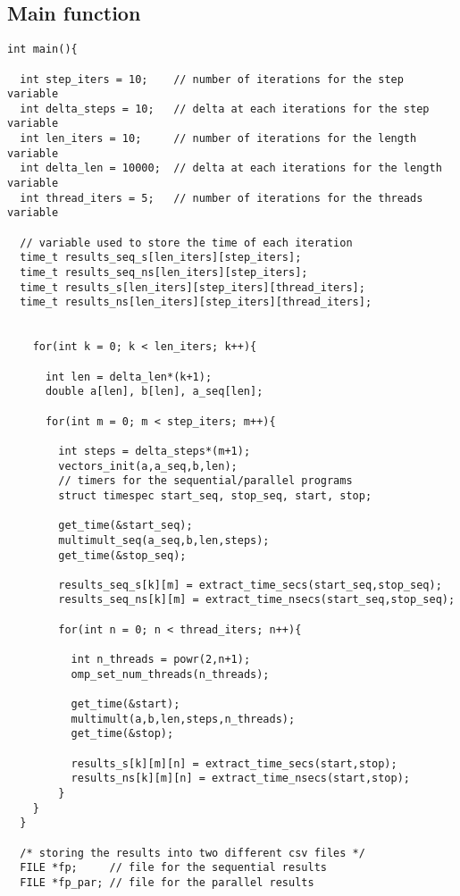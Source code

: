 \documentclass[a4paper]{article}
\begin{document}
\subsection{Main function}

\begin{verbatim}
int main(){

  int step_iters = 10;    // number of iterations for the step variable
  int delta_steps = 10;   // delta at each iterations for the step variable
  int len_iters = 10;     // number of iterations for the length variable
  int delta_len = 10000;  // delta at each iterations for the length variable
  int thread_iters = 5;   // number of iterations for the threads variable

  // variable used to store the time of each iteration
  time_t results_seq_s[len_iters][step_iters];
  time_t results_seq_ns[len_iters][step_iters];
  time_t results_s[len_iters][step_iters][thread_iters];
  time_t results_ns[len_iters][step_iters][thread_iters];


    for(int k = 0; k < len_iters; k++){

      int len = delta_len*(k+1);
      double a[len], b[len], a_seq[len];

      for(int m = 0; m < step_iters; m++){

        int steps = delta_steps*(m+1);
        vectors_init(a,a_seq,b,len);
        // timers for the sequential/parallel programs
        struct timespec start_seq, stop_seq, start, stop;

        get_time(&start_seq);
        multimult_seq(a_seq,b,len,steps);
        get_time(&stop_seq);

        results_seq_s[k][m] = extract_time_secs(start_seq,stop_seq);
        results_seq_ns[k][m] = extract_time_nsecs(start_seq,stop_seq);

        for(int n = 0; n < thread_iters; n++){

          int n_threads = powr(2,n+1);
          omp_set_num_threads(n_threads);

          get_time(&start);
          multimult(a,b,len,steps,n_threads);
          get_time(&stop);

          results_s[k][m][n] = extract_time_secs(start,stop);
          results_ns[k][m][n] = extract_time_nsecs(start,stop);
        }
    }
  }

  /* storing the results into two different csv files */
  FILE *fp;     // file for the sequential results
  FILE *fp_par; // file for the parallel results


\end{verbatim}
\end{document}
